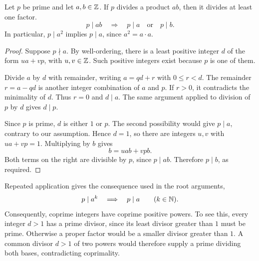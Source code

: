 \begin{lemma}
  \label{thm:analysis-i:euclid-prime-divisors}
  Let $p$ be prime and let $a,b\in\mathbb{Z}$. If $p$ divides a product $ab$,
  then it divides at least one factor.
  \[
    p\mid ab\quad\Longrightarrow\quad
    p\mid a\quad\text{or}\quad p\mid b.
  \]
  In particular, $p\mid a^2$ implies $p\mid a$, since $a^2=a\cdot a$.
\end{lemma}
\begin{proof}
  Suppose $p\nmid a$. By well-ordering, there is a least positive
  integer $d$ of the form $ua+vp$, with $u,v\in\mathbb{Z}$. Such positive
  integers exist because $p$ is one of them.

  Divide $a$ by $d$ with remainder, writing $a=qd+r$ with
  $0\le r<d$. The remainder $r=a-qd$ is another integer combination
  of $a$ and $p$. If $r>0$, it contradicts the minimality of $d$.
  Thus $r=0$ and $d\mid a$. The same argument applied to division
  of $p$ by $d$ gives $d\mid p$.

  Since $p$ is prime, $d$ is either $1$ or $p$. The second possibility
  would give $p\mid a$, contrary to our assumption. Hence $d=1$,
  so there are integers $u,v$ with $ua+vp=1$. Multiplying by $b$ gives
  \[
    b=uab+vpb.
  \]
  Both terms on the right are divisible by $p$, since $p\mid ab$.
  Therefore $p\mid b$, as required.
\end{proof}

Repeated application gives the consequence used in the root arguments,
\[
  p\mid a^k\quad\Longrightarrow\quad p\mid a
  \qquad(k\in\mathbb{N}).
\]
Consequently, coprime integers have coprime positive powers. To see this,
every integer $d>1$ has a prime divisor, since its least divisor greater
than $1$ must be prime. Otherwise a proper factor would be a smaller
divisor greater than $1$. A common divisor $d>1$ of two powers would
therefore supply a prime dividing both bases, contradicting coprimality.

